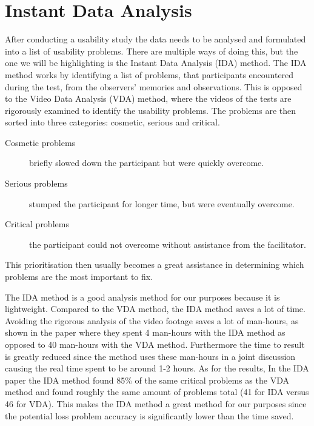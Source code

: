 \section{Instant Data Analysis}
\label{section:IDA}
After conducting a usability study the data needs to be analysed and formulated into a list of usability problems.
There are multiple ways of doing this, but the one we will be highlighting is the Instant Data Analysis (IDA)\cite{IDA} method.
The IDA method works by identifying a list of problems, that participants encountered during the test, from the observers' memories and observations.
This is opposed to the Video Data Analysis (VDA) method, where the videos of the tests are rigorously examined to identify the usability problems.
The problems are then sorted into three categories: cosmetic, serious and critical.
\begin{description}
\item[Cosmetic problems] briefly slowed down the participant but were quickly overcome.
\item[Serious problems] stumped the participant for longer time, but were eventually overcome.
\item[Critical problems] the participant could not overcome without assistance from the facilitator.
\end{description}
This prioritisation then usually becomes a great assistance in determining which problems are the most important to fix.

The IDA method is a good analysis method for our purposes because it is lightweight.
Compared to the VDA method, the IDA method saves a lot of time.
Avoiding the rigorous analysis of the video footage saves a lot of man-hours, as shown in the paper\cite{IDA} where they spent 4 man-hours with the IDA method as opposed to 40 man-hours with the VDA method.
Furthermore the time to result is greatly reduced since the method uses these man-hours in a joint discussion causing the real time spent to be around 1-2 hours.%
As for the results, In the IDA paper\cite{IDA} the IDA method found 85\% of the same critical problems as the VDA method and found roughly the same amount of problems total (41 for IDA versus 46 for VDA).
This makes the IDA method a great method for our purposes since the potential loss problem accuracy is significantly lower than the time saved.